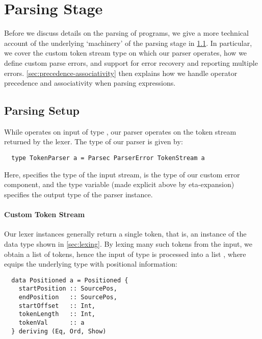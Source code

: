 




\section{Parsing Stage} \label{sec:parsing}

Before we discuss details on the parsing of programs, we give a more technical
account of the underlying `machinery' of the parsing stage in
\cref{sec:parsing-setup}. In particular, we cover the custom token stream type
on which our parser operates, how we define custom parse errors, and support for
error recovery and reporting multiple errors.
\cref{sec:precedence-associativity} then explains how we handle operator
precedence and associativity when parsing expressions.


\subsection{Parsing Setup} \label{sec:parsing-setup}

While  operates on input of type , our parser
 operates on the token stream returned by the lexer.
The type of our parser is given by:
%
\begin{verbatim}
  type TokenParser a = Parsec ParserError TokenStream a
\end{verbatim}
Here,  specifies the type of the input stream,
 is the type of our custom error component, and the type
variable  (made explicit above by eta-expansion) specifies the output
type of the parser instance.


\paragraph{Custom Token Stream}

Our lexer instances generally return a single token, that is, an instance of
the  data type shown in \cref{sec:lexing}. By lexing many such
tokens from the input, we obtain a list of tokens, hence the input of type
 is processed into a list ,
where  equips the underlying type  with positional
information:
\begin{verbatim}
  data Positioned a = Positioned {
    startPosition :: SourcePos,
    endPosition   :: SourcePos,
    startOffset   :: Int,
    tokenLength   :: Int,
    tokenVal      :: a
  } deriving (Eq, Ord, Show)
\end{verbatim}

